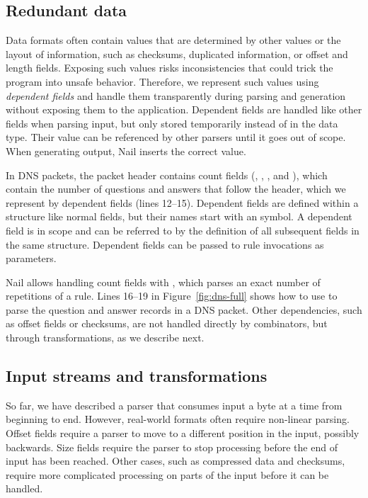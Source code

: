 


\subsection{Redundant data}
\label{s:dependent}
Data formats often contain values that are determined by other values or the layout of information,
such as checksums, duplicated information, or offset and  length fields. Exposing such values risks
inconsistencies that could trick the program into unsafe behavior. Therefore, we represent such values using \emph{dependent fields} and handle them transparently during
parsing and generation without exposing them to the application. 
Dependent fields are handled like other fields when parsing input, but only stored temporarily
instead of in the data type. Their value can be referenced by other parsers until it goes out of scope.
When generating output, Nail inserts the correct value.

In DNS packets, the packet header contains count fields (,
, , and ), which contain the number of questions and answers that follow the
header, which we represent by dependent fields (lines 12--15).
Dependent fields are defined within a structure like normal fields, but their names start with an  symbol.
A dependent field is in scope and can be referred to by the definition of all subsequent fields in
the same structure. Dependent fields can be passed to rule invocations as parameters.


Nail allows handling count fields with , which parses an exact number of repetitions of a rule. Lines 16--19 in Figure~\ref{fig:dns-full} shows how to use  to parse the question and
answer records in a DNS packet.
Other dependencies, such as offset fields or checksums, are not handled directly by combinators, but
through  transformations, as we describe next.

\subsection{Input streams and transformations}
\label{s:transforms}
So far, we have described a parser that consumes input a byte at a time from beginning to end.
However, real-world formats often require non-linear parsing. Offset fields require a parser to move
to a different position in the input, possibly backwards. Size fields require the parser to stop
processing before the end of input has been reached.
Other cases, such as compressed data and checksums, require more complicated processing on parts of the input
before it can be handled.


